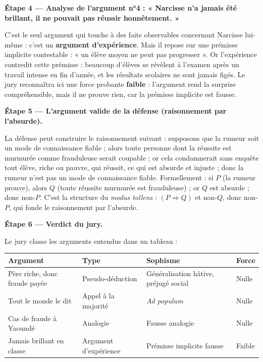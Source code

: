 \documentclass[11pt]{article}
\begin{document}
\begin{exoresolu}
\textbf{Étape 4 — Analyse de l'argument n°4 : « Narcisse n'a jamais été brillant, il ne pouvait pas réussir honnêtement. »}

C'est le seul argument qui touche à des faits observables concernant Narcisse lui-même : c'est un \textbf{argument d'expérience}. Mais il repose sur une prémisse implicite contestable : « un élève moyen ne peut pas progresser ». Or l'expérience contredit cette prémisse : beaucoup d'élèves se révèlent à l'examen après un travail intense en fin d'année, et les résultats scolaires ne sont jamais figés. Le jury reconnaîtra ici une force probante \textbf{faible} : l'argument rend la surprise compréhensible, mais il ne prouve rien, car la prémisse implicite est fausse.

\textbf{Étape 5 — L'argument valide de la défense (raisonnement par l'absurde).}

La défense peut construire le raisonnement suivant : supposons que la rumeur soit un mode de connaissance fiable ; alors toute personne dont la réussite est murmurée comme frauduleuse serait coupable ; or cela condamnerait sans enquête tout élève, riche ou pauvre, qui réussit, ce qui est absurde et injuste ; donc la rumeur n'est pas un mode de connaissance fiable. Formellement : si $P$ (la rumeur prouve), alors $Q$ (toute réussite murmurée est frauduleuse) ; or $Q$ est absurde ; donc non-$P$. C'est la structure du \emph{modus tollens} : $(P \Rightarrow Q)$ et non-$Q$, donc non-$P$, qui fonde le raisonnement par l'absurde.

\textbf{Étape 6 — Verdict du jury.}

Le jury classe les arguments entendus dans un tableau :

\begin{center}
\begin{tabularx}{\linewidth}{|l|X|X|l|}
\hline
\rowcolor{popblueL} \textbf{Argument} & \textbf{Type} & \textbf{Sophisme} & \textbf{Force} \\
\hline
Père riche, donc fraude payée & Pseudo-déduction & Généralisation hâtive, préjugé social & Nulle \\
\hline
Tout le monde le dit & Appel à la majorité & \emph{Ad populum} & Nulle \\
\hline
Cas de fraude à Yaoundé & Analogie & Fausse analogie & Nulle \\
\hline
Jamais brillant en classe & Argument d'expérience & Prémisse implicite fausse & Faible \\
\hline
\end{tabularx}
\end{center}


\end{exoresolu}
\end{document}
